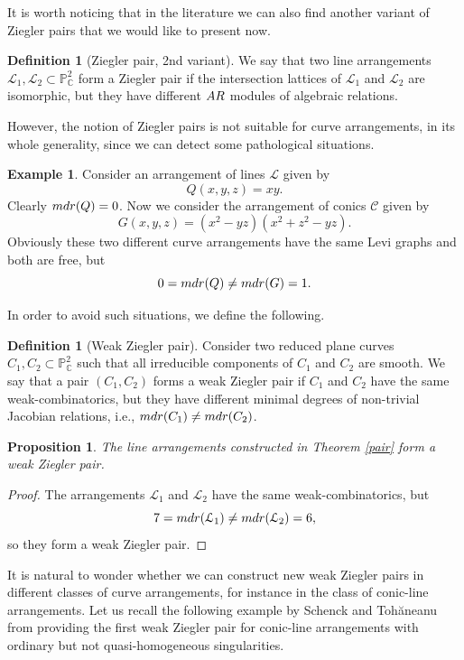 \documentclass[12pt]{article}
\theoremstyle{plain}
\newtheorem{proposition}[thm]{Proposition}
\theoremstyle{definition}
\newtheorem{definition}[thm]{Definition}
\newtheorem{example}[thm]{Example}
\begin{document}
It is worth noticing that in the literature we can also find another variant of Ziegler pairs that we would like to present now.
\begin{definition}[Ziegler pair, 2nd variant]
We say that two line arrangements $\mathcal{L}_{1}, \mathcal{L}_{2} \subset \mathbb{P}^{2}_{\mathbb{C}}$ form a Ziegler pair if the intersection lattices of $\mathcal{L}_{1}$ and $\mathcal{L}_{2}$ are isomorphic, but they have different ${\rm AR}$ modules of algebraic relations.
\end{definition}
However, the notion of Ziegler pairs is not suitable for curve arrangements, in its whole generality, since we can detect some pathological situations.
\begin{example}
Consider an arrangement of lines $\mathcal{L}$ given by 
$$Q(x,y,z)=xy.$$
Clearly ${\rm mdr}(Q)=0$.
Now we consider the arrangement of conics $\mathcal{C}$ given by
$$G(x,y,z)=(x^2-yz)(x^{2}+z^{2}-yz).$$
Obviously these two different curve arrangements have the same Levi graphs and both are free, but
$$0={\rm mdr}(Q)\neq {\rm mdr}(G)=1.$$
\end{example}
In order to avoid such situations, we define the following.
\begin{definition}[Weak Ziegler pair]
Consider two reduced plane curves $C_{1}, C_{2} \subset \mathbb{P}^{2}_{\mathbb{C}}$ such that all irreducible components of $C_{1}$ and $C_{2}$ are smooth. We say that a pair $(C_{1},C_{2})$ forms a weak Ziegler pair if $C_{1}$ and $C_{2}$ have the same weak-combinatorics, but they have different minimal degrees of non-trivial Jacobian relations, i.e., ${\rm mdr}(C_{1}) \neq {\rm mdr}(C_{2})$.
\end{definition}
\begin{proposition}
    The line arrangements constructed in Theorem \ref{pair} form a weak Ziegler pair.
\end{proposition}
\begin{proof}
The arrangements $\mathcal{L}_{1}$ and $\mathcal{L}_{2}$ have the same weak-combinatorics, but
$$7 = {\rm mdr}(\mathcal{L}_{1}) \neq {\rm mdr}(\mathcal{L}_{2})=6,$$
so they form a weak Ziegler pair.
\end{proof}
It is natural to wonder whether we can construct new weak Ziegler pairs in different classes of curve arrangements, for instance in the class of conic-line arrangements. Let us recall the following example by Schenck and Toh\u aneanu from \cite{STo} providing the first weak Ziegler pair for conic-line arrangements with ordinary but not quasi-homogeneous singularities.
\end{document}
